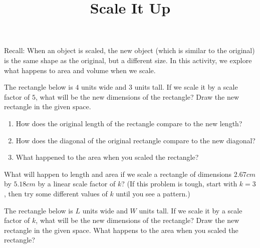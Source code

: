 \documentclass[nooutcomes,noauthor, handout]{ximera}
\begin{document}



%


\title{Scale It Up}
\begin{abstract}
\end{abstract}
Recall: When an object is scaled, the new object (which is similar to the original) is the same shape as the original, but a different size.  In this activity, we explore what happens to area and volume when we scale.

\maketitle

\begin{problem}
The rectangle below is $4$ units wide and $3$ units tall. If we scale it by a scale factor of $5$, what will be the new dimensions of the rectangle? Draw the new rectangle in the given space.\\

 \hspace{4cm}
\vskip 2.5in

\begin{enumerate}
    \item How does the original length of the rectangle compare to the new length?
    \item How does the diagonal of the original rectangle compare to the new diagonal?
    \item What happened to the area when you scaled the rectangle?
\end{enumerate}


\end{problem}


\begin{problem}
What will happen to length and area if we scale a rectangle of dimensions $2.67 cm$ by $5.18 cm$ by a linear scale factor of $k$? (If this problem is tough, start with $k=3$, then try some different values of $k$ until you see a pattern.)

\end{problem}



\begin{problem}
The rectangle below is $L$ units wide and $W$ units tall. If we scale it by a scale factor of $k$, what will be the new dimensions of the rectangle? Draw the new rectangle in the given space. What happens to the area when you scaled the rectangle?\\

 \hspace{4cm}
\vskip 2.5in

\end{problem}
\end{document}

